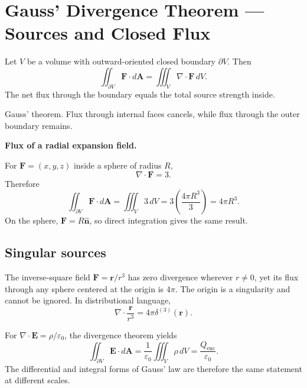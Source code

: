 \section{Gauss' Divergence Theorem --- Sources and Closed Flux}
\label{sec:gauss-theorem}

Let $V$ be a volume with outward-oriented closed boundary $\partial V$. Then
\[
\boxed{\iint_{\partial V}\mathbf F\cdot d\mathbf A
=\iiint_V\nabla\cdot\mathbf F\,dV.}
\]
The net flux through the boundary equals the total source strength inside.

\begin{bookfigure}{Gauss' theorem. Flux through internal faces cancels, while flux through the outer boundary remains.}

\label{fig:gauss-volume}
\end{bookfigure}

\begin{workedexample}
\textbf{Flux of a radial expansion field.}\par
For $\mathbf F=(x,y,z)$ inside a sphere of radius $R$,
\[
\nabla\cdot\mathbf F=3.
\]
Therefore
\[
\iint_{\partial V}\mathbf F\cdot d\mathbf A
=\iiint_V3\,dV=3\left(\frac{4\pi R^3}{3}\right)=4\pi R^3.
\]
On the sphere, $\mathbf F=R\hat{\mathbf n}$, so direct integration gives the same result.
\end{workedexample}

\subsection{Singular sources}
The inverse-square field $\mathbf F=\mathbf r/r^3$ has zero divergence wherever $r\neq0$, yet its flux through any sphere centered at the origin is $4\pi$. The origin is a singularity and cannot be ignored. In distributional language,
\[
\nabla\cdot\frac{\mathbf r}{r^3}=4\pi\delta^{(3)}(\mathbf r).
\]

\begin{keyidea}
For $\nabla\cdot\mathbf E=\rho/\varepsilon_0$, the divergence theorem yields
\[
\iint_{\partial V}\mathbf E\cdot d\mathbf A
=\frac{1}{\varepsilon_0}\iiint_V\rho\,dV
=\frac{Q_{\mathrm{enc}}}{\varepsilon_0}.
\]
The differential and integral forms of Gauss' law are therefore the same statement at different scales.
\end{keyidea}
